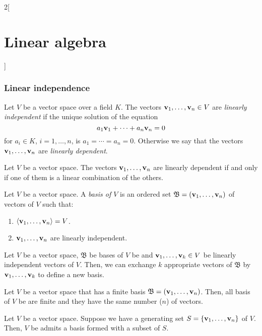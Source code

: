 \documentclass[../../../main.tex]{subfiles}
\begin{document}
\begin{multicols}{2}[\section{Linear algebra}]
  \subsubsection*{Linear independence}
  \begin{definition}
    Let $V$ be a vector space over a field $K$. The vectors $\vb{v}_1,\ldots,\vb{v}_n\in V$ are \textit{linearly independent} if the unique solution of the equation $$a_1\vb{v}_1+\cdots+a_n\vb{v}_n=0$$ for $a_i\in K$, $i=1,\ldots,n$, is $a_1=\cdots=a_n=0$. Otherwise we say that the vectors $\vb{v}_1,\ldots,\vb{v}_n$ are \textit{linearly dependent}.
  \end{definition}
  \begin{lemma}
    Let $V$ be a vector space. The vectors $\vb{v}_1,\ldots,\vb{v}_n$ are linearly dependent if and only if one of them is a linear combination of the others.
  \end{lemma}
  \begin{definition}
    Let $V$ be a vector space. A \textit{basis of $V$} is an ordered set $\mathfrak{B}=(\vb{v}_1,\ldots,\vb{v}_n)$ of vectors of $V$ such that:
    \begin{enumerate}
      \item $\langle \vb{v}_1,\ldots,\vb{v}_n\rangle = V$.
      \item $\vb{v}_1,\ldots,\vb{v}_n$ are linearly independent.
    \end{enumerate}
  \end{definition}
  \begin{lemma}
    Let $V$ be a vector space, $\mathfrak{B}$ be bases of $V$ be and $\vb{v}_1,\ldots,\vb{v}_k\in V$ be linearly independent vectors of $V$. Then, we can exchange $k$ appropriate vectors of $\mathfrak{B}$ by $\vb{v}_1,\ldots,\vb{v}_k$ to define a new basis.
  \end{lemma}
  \begin{corollary}
    Let $V$ be a vector space that has a finite basis $\mathfrak{B}=(\vb{v}_1,\ldots,\vb{v}_n)$. Then, all basis of $V$ be are finite and they have the same number ($n$) of vectors.
  \end{corollary}
  \begin{lemma}
    Let $V$ be a vector space. Suppose we have a generating set $S=\{\vb{v}_1,\ldots,\vb{v}_n\}$ of $V$. Then, $V$ be admits a basis formed with a subset of $S$.
  \end{lemma}

\end{multicols}
\end{document}
